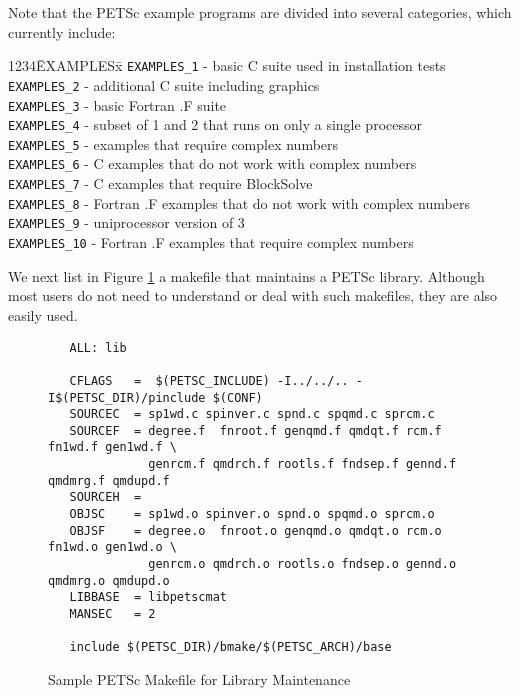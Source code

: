 Note that the PETSc example programs are divided into several
categories, which currently include: 
\begin{tabbing}
1234\= EXAMPLESx\= \kill
\> {\tt EXAMPLES\_1} \> - basic C suite used in installation tests\\
\> {\tt EXAMPLES\_2} \> - additional C suite including graphics\\
\> {\tt EXAMPLES\_3} \> - basic Fortran .F suite\\
\> {\tt EXAMPLES\_4} \> - subset of 1 and 2 that runs on only a single processor\\
\> {\tt EXAMPLES\_5} \> - examples that require complex numbers\\
\> {\tt EXAMPLES\_6} \> - C examples that do not work with complex numbers\\
\> {\tt EXAMPLES\_7} \> - C examples that require BlockSolve\\
\> {\tt EXAMPLES\_8} \> - Fortran .F examples that do not work with complex numbers\\
\> {\tt EXAMPLES\_9} \> - uniprocessor version of 3\\
\> {\tt EXAMPLES\_10} \> - Fortran .F examples that require complex numbers\\
\end{tabbing}

We next list in Figure \ref{fig:make3} a makefile that maintains a PETSc 
library.  Although most users do not need to understand or deal with such
makefiles, they are also easily used.

\begin{figure}[H]
{\small
\begin{verbatim}
   ALL: lib

   CFLAGS   =  $(PETSC_INCLUDE) -I../../.. -I$(PETSC_DIR)/pinclude $(CONF)
   SOURCEC  = sp1wd.c spinver.c spnd.c spqmd.c sprcm.c
   SOURCEF  = degree.f  fnroot.f genqmd.f qmdqt.f rcm.f fn1wd.f gen1wd.f \
              genrcm.f qmdrch.f rootls.f fndsep.f gennd.f qmdmrg.f qmdupd.f
   SOURCEH  = 
   OBJSC    = sp1wd.o spinver.o spnd.o spqmd.o sprcm.o
   OBJSF    = degree.o  fnroot.o genqmd.o qmdqt.o rcm.o fn1wd.o gen1wd.o \
              genrcm.o qmdrch.o rootls.o fndsep.o gennd.o qmdmrg.o qmdupd.o
   LIBBASE  = libpetscmat
   MANSEC   = 2

   include $(PETSC_DIR)/bmake/$(PETSC_ARCH)/base
\end{verbatim}
}
\caption{Sample PETSc Makefile for Library Maintenance}
\label{fig:make3}
\end{figure}


